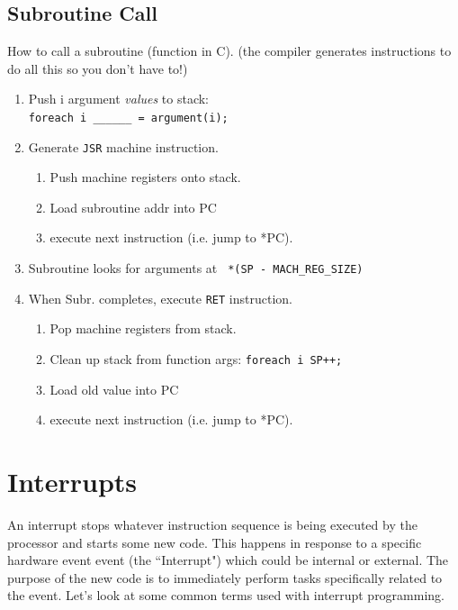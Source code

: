 \subsection{Subroutine Call}
How to call a subroutine (function in C).
(the compiler generates instructions to do all this
so you don't have to!)
\begin{enumerate}
        \item Push i argument {\it values} to stack: \\
                {\tt foreach {i} \_\_\_\_\_\_ = argument(i);}
        \item Generate {\tt JSR} machine instruction.
        \begin{enumerate}
                \item Push machine registers onto stack.
                \item Load subroutine addr into PC
                \item execute next instruction (i.e. jump to
                *PC).
        \end{enumerate}
        \item Subroutine looks for arguments at {\tt
                *(SP - MACH\_REG\_SIZE) }
        \item When Subr. completes, execute {\tt RET} instruction.
        \begin{enumerate}
                \item Pop machine registers from stack.
                \item Clean up stack from function args:
                {\tt foreach {i} SP++;}
                \item Load old value into PC
                \item execute next instruction (i.e. jump to
                *PC).
        \end{enumerate}



\end{enumerate}

\section{Interrupts}

An interrupt stops whatever instruction sequence is being executed by the processor and starts
some new code.  This happens in response to a specific hardware event event (the ``Interrupt") which 
could be internal or external.  The purpose of the new code is to immediately perform tasks 
specifically related to the event.   Let's look at some common terms used with interrupt programming.


